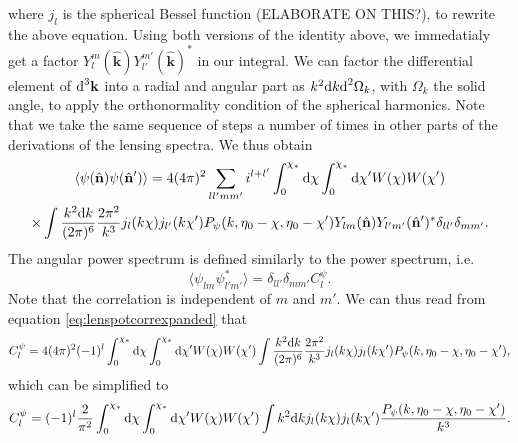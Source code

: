 \documentclass[11pt]{article} %
\DeclareRobustCommand{\d}{\ifmmode\text{d}\else d\fi}
\begin{document}
where $j_l$ is the spherical Bessel function (ELABORATE ON THIS?), to rewrite the above equation. Using both versions of the identity above, we immedatialy get a factor $Y_l^m(\hat{\mathbf k})Y_{l'}^{m'}(\hat{\mathbf k})^*$ in our integral. We can factor the differential element of $\d^3\mathbf k$ into a radial and angular part as $k^2\d k\d^2\Omega_k$, with $\Omega_k$ the solid angle, to apply the orthonormality condition of the spherical harmonics. Note that we take the same sequence of steps a number of times in other parts of the derivations of the lensing spectra. We thus obtain
\begin{gather}
    \langle \psi(\hat{\mathbf n})\psi(\hat{\mathbf n}') \rangle = 4(4\pi)^2\sum_{ll'mm'}i^{l+l'}\int_0^{\chi_*}\d \chi\int_0^{\chi_*}\d \chi' W(\chi)W(\chi')\\\times\int \frac{k^2\d k}{(2\pi)^6}\frac{2\pi^2}{k^3}j_l(k\chi)j_{l'}(k\chi')P_\psi(k,\eta_0 - \chi, \eta_0-\chi')Y_{lm}(\hat{\mathbf n})Y_{l'm'}(\hat{\mathbf n}')^*\delta_{ll'}\delta_{mm'}. \label{eq:lenspotcorrexpanded}
\end{gather}
The angular power spectrum is defined similarly to the power spectrum, i.e.
\begin{equation}
    \langle \psi_{lm}\psi_{l'm'}^* \rangle = \delta_{ll'}\delta_{mm'}C_l^\psi.
\end{equation}
Note that the correlation is independent of $m$ and $m'$. %
We can thus read from equation \ref{eq:lenspotcorrexpanded} that
\begin{gather}
    C_l^\psi = 4(4\pi)^2(-1)^{l}\int_0^{\chi_*}\d \chi\int_0^{\chi_*}\d \chi' W(\chi)W(\chi')\int \frac{k^2\d k}{(2\pi)^6}\frac{2\pi^2}{k^3}j_l(k\chi)j_{l}(k\chi')P_\psi(k,\eta_0 - \chi, \eta_0-\chi'),
\end{gather}
which can be simplified to
\begin{gather}
    C_l^\psi = (-1)^{l}\frac{2}{\pi^2}\int_0^{\chi_*}\d \chi\int_0^{\chi_*}\d \chi' W(\chi)W(\chi')\int k^2\d kj_l(k\chi)j_{l}(k\chi')\frac{P_\psi(k,\eta_0 - \chi, \eta_0-\chi')}{k^3}.
\end{gather}
\end{document}
